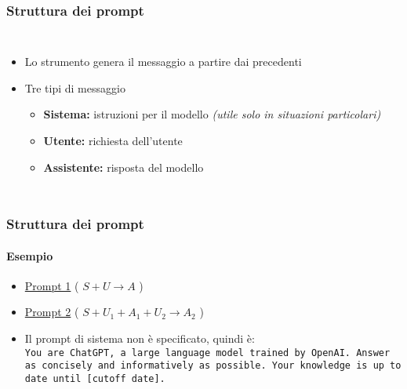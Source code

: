\begin{contentframe}
    \frametitle{Struttura dei prompt}

    \begin{columns}
        \begin{itemize}
            \item Lo strumento genera il messaggio a partire dai precedenti
    
            \bigskip
            \item Tre tipi di messaggio
            \begin{itemize}
                \item \textbf{Sistema:} istruzioni per il modello \textit{(utile solo in situazioni particolari)}
                \item \textbf{Utente:} richiesta dell'utente
                \item \textbf{Assistente:} risposta del modello
            \end{itemize}
        \end{itemize}

        \centering
    \end{columns}
\end{contentframe}

\begin{exampleframe}
    \frametitle{Struttura dei prompt}
    \framesubtitle{Esempio}

    \begin{itemize}
        \item \href{https://chatgpt.com/share/6759a21f-19ec-8003-a172-e0630eae761d}{Prompt 1} ( $\boxed{S + U} \rightarrow A$ )
        \item \href{https://chatgpt.com/share/67605a8c-2fec-8003-8e82-c54f49687c1b}{Prompt 2} ( $\boxed{S + U_1 + A_1 + U_2} \rightarrow A_2$ )

        \bigskip
        \item Il prompt di sistema non è specificato, quindi è:\\
            \texttt{You are ChatGPT, a large language model trained by OpenAI. Answer as concisely and informatively as possible. Your knowledge is up to date until [cutoff date].}
    \end{itemize}
\end{exampleframe}


